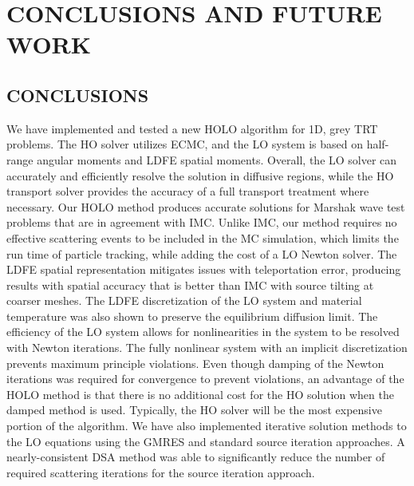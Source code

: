 \chapter{ \uppercase{Conclusions and Future Work} }
\label{chp:conclusions}

\section{CONCLUSIONS}

We have implemented and tested a new HOLO algorithm for 1D, grey TRT problems.  The HO
solver utilizes ECMC, and the LO system is based on half-range angular moments and LDFE
spatial moments. Overall, the LO solver can accurately and efficiently resolve the solution in diffusive regions, while the HO
transport solver provides the accuracy of a full transport treatment where necessary. 
Our HOLO method produces accurate solutions for Marshak wave test
problems that are in agreement with IMC.  Unlike IMC, our method requires no effective
scattering events to be included in the MC simulation, which limits the run time of
particle tracking, while adding the cost of a LO Newton solver. The LDFE spatial
representation mitigates issues with teleportation error, producing results with spatial
accuracy that is better than IMC with source tilting at coarser meshes.  The LDFE discretization of the LO system
and material temperature was also shown to preserve the equilibrium diffusion limit.  
The efficiency of the LO system allows for nonlinearities in the system to be resolved
with Newton iterations.  The fully nonlinear system with an implicit discretization
prevents maximum principle violations. Even though damping of the Newton iterations was
required for convergence to prevent violations, an advantage of the HOLO method is that
there is no additional cost for the HO solution when the damped method is used.
Typically, the HO solver will be the most expensive portion of the algorithm. 
We have also implemented iterative solution methods to the LO equations using the GMRES and
standard source iteration approaches.  A nearly-consistent DSA method was able to
significantly reduce the number of required scattering iterations for the source iteration
approach. 

